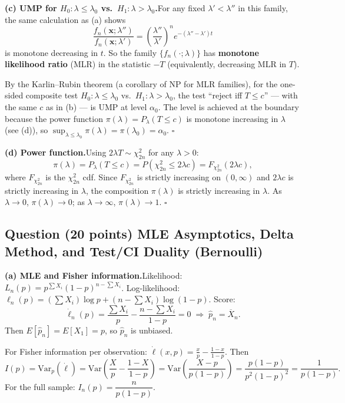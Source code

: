 \documentclass[11pt]{article}
\newcounter{qnum}
\newcommand{\question}[2]{\stepcounter{qnum}\subsection*{Question \theqnum \quad (#1 points) \hfill #2}}
\newcommand{\Var}{\mathrm{Var}}
\begin{document}
\textbf{(c) UMP for $H_0:\lambda \le \lambda_0$ vs.\ $H_1: \lambda > \lambda_0$.}\quad For any fixed $\lambda' < \lambda''$ in this family, the same calculation as (a) shows
\[
\frac{f_n(\mathbf{x};\lambda'')}{f_n(\mathbf{x};\lambda')} = \left(\frac{\lambda''}{\lambda'}\right)^n e^{-(\lambda''-\lambda')t}
\]
is monotone decreasing in $t$. So the family $\{f_n(\cdot;\lambda)\}$ has \textbf{monotone likelihood ratio} (MLR) in the statistic $-T$ (equivalently, decreasing MLR in $T$).

By the Karlin--Rubin theorem (a corollary of NP for MLR families), for the one-sided composite test $H_0: \lambda \le \lambda_0$ vs.\ $H_1: \lambda > \lambda_0$, the test ``reject iff $T \le c$'' --- with the same $c$ as in (b) --- is UMP at level $\alpha_0$. The level is achieved at the boundary because the power function $\pi(\lambda) = P_\lambda(T \le c)$ is monotone increasing in $\lambda$ (see (d)), so $\sup_{\lambda \le \lambda_0}\pi(\lambda) = \pi(\lambda_0) = \alpha_0$. \hfill$\square$

\medskip

\textbf{(d) Power function.}\quad Using $2\lambda T \sim \chi^2_{2n}$ for any $\lambda > 0$:
\[
\pi(\lambda) = P_\lambda(T \le c) = P(\chi^2_{2n} \le 2\lambda c) = F_{\chi^2_{2n}}(2\lambda c),
\]
where $F_{\chi^2_{2n}}$ is the $\chi^2_{2n}$ cdf. Since $F_{\chi^2_{2n}}$ is strictly increasing on $(0,\infty)$ and $2\lambda c$ is strictly increasing in $\lambda$, the composition $\pi(\lambda)$ is strictly increasing in $\lambda$. As $\lambda\to 0$, $\pi(\lambda)\to 0$; as $\lambda\to\infty$, $\pi(\lambda)\to 1$. \hfill$\square$

\question{20}{MLE Asymptotics, Delta Method, and Test/CI Duality (Bernoulli)}

\textbf{(a) MLE and Fisher information.}\quad Likelihood: $L_n(p) = p^{\sum X_i}(1-p)^{n-\sum X_i}$. Log-likelihood: $\ell_n(p) = (\sum X_i)\log p + (n - \sum X_i)\log(1-p)$. Score:
\[
\dot\ell_n(p) = \frac{\sum X_i}{p} - \frac{n-\sum X_i}{1-p} = 0 \;\Longrightarrow\; \hat p_n = \overline{X}_n.
\]
Then $E[\hat p_n] = E[X_1] = p$, so $\hat p_n$ is unbiased.

For Fisher information per observation: $\dot\ell(x,p) = \frac{x}{p} - \frac{1-x}{1-p}$. Then
\[
I(p) = \Var_p(\dot\ell) = \Var\!\left(\frac{X}{p} - \frac{1-X}{1-p}\right) = \Var\!\left(\frac{X-p}{p(1-p)}\right) = \frac{p(1-p)}{p^2(1-p)^2} = \frac{1}{p(1-p)}.
\]
For the full sample: $\boxed{I_n(p) = \dfrac{n}{p(1-p)}}.$

\medskip
\end{document}
